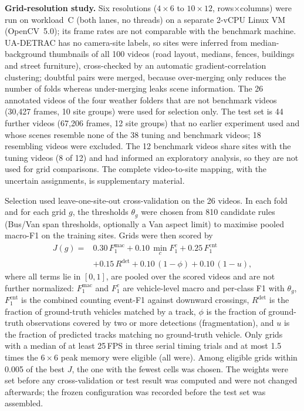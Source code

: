 \documentclass[conference]{IEEEtran}
\begin{document}
\textbf{Grid-resolution study.} Six resolutions ($4{\times}6$ to
$10{\times}12$, rows$\times$columns) were run on workload~C (both lanes,
no threads) on a separate 2-vCPU Linux VM (OpenCV~5.0); its frame rates
are not comparable with the benchmark machine. UA-DETRAC has no
camera-site labels, so sites were inferred from median-background
thumbnails of all 100 videos (road layout, medians, fences, buildings
and street furniture), cross-checked by an automatic gradient-correlation
clustering; doubtful pairs were merged, because over-merging only reduces
the number of folds whereas under-merging leaks scene information. The
26 annotated videos of the four weather folders that are not benchmark
videos (30{,}427 frames, 10 site groups) were used for selection only.
The test set is 44 further videos (67{,}206 frames, 12 site groups) that
no earlier experiment used and whose scenes resemble none of the 38
tuning and benchmark videos; 18 resembling videos were excluded. The
12 benchmark videos share sites with the tuning videos (8 of 12) and had
informed an exploratory analysis, so they are not used for grid
comparisons. The complete video-to-site mapping, with the uncertain
assignments, is supplementary material.

Selection used leave-one-site-out cross-validation on the 26 videos. In
each fold and for each grid $g$, the thresholds $\theta_g$ were chosen
from 810 candidate rules (Bus/Van span thresholds, optionally a Van
aspect limit) to maximise pooled macro-F1 on the training sites. Grids
were then scored by
\begin{equation}
\begin{split}
J(g)={}&0.30\,F_1^{\text{mac}}+0.10\,\min_c F_1^{c}+0.25\,F_1^{\text{cnt}}\\
&+0.15\,R^{\text{det}}+0.10\,(1-\phi)+0.10\,(1-u),
\end{split}
\label{eq:objective}
\end{equation}
where all terms lie in $[0,1]$, are pooled over the scored videos and are
not further normalized: $F_1^{\text{mac}}$ and $F_1^{c}$ are vehicle-level
macro and per-class F1 with $\theta_g$, $F_1^{\text{cnt}}$ is the combined
counting event-F1 against downward crossings, $R^{\text{det}}$ is the
fraction of ground-truth vehicles matched by a track, $\phi$ is the
fraction of ground-truth observations covered by two or more detections
(fragmentation), and $u$ is the fraction of predicted tracks matching no
ground-truth vehicle. Only grids with a median of at least 25\,FPS in
three serial timing trials and at most 1.5 times the $6{\times}6$ peak
memory were eligible (all were). Among eligible grids within 0.005 of the
best $J$, the one with the fewest cells was chosen. The weights were set
before any cross-validation or test result was computed and were not
changed afterwards; the frozen configuration was recorded before the
test set was assembled.
\end{document}
